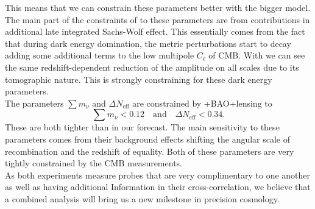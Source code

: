 \documentclass[../main.tex]{subfiles}
\begin{document}
    This means that we can constrain these parameters better with the bigger model. The main part of the constraints of \Planck to these parameters are from contributions in additional late integrated Sachs-Wolf effect. This essentially comes from the fact that during dark energy domination, the metric perturbations start to decay adding some additional terms to the low multipole $C_\ell$ of CMB. With \Euclid we can see the same redshift-dependent reduction of the amplitude on all scales due to its tomographic nature. This is strongly constraining for these dark energy parameters.\\
    The parameters $\sum m_\nu$ and $\Delta N_\mathrm{eff}$ are constrained by \Planck+BAO+lensing to 
    \begin{equation}
        \sum m_\nu < 0.12 \quad \text{and}\quad \Delta N_\mathrm{eff} < 0.34.
    \end{equation}
    These are both tighter than in our \Euclid forecast. The main sensitivity to these parameters comes from their background effects shifting the angular scale of recombination and the redshift of equality. Both of these parameters are very tightly constrained by the CMB measurements.\\
    As both experiments measure probes that are very complimentary to one another as well as having additional Information in their cross-correlation, we believe that a combined analysis will bring us a new milestone in precision cosmology.
    \begin{table}[!h]
        \renewcommand{\arraystretch}{1.2}
          \centering
        \caption{Forecast 68\% confidence levels for the different \Euclid probes and the combined probe. For the parameters $\sum m_\nu$ and $\Delta \neff$ we only state the 95\% upper limit as they are bound from below by their theoretical prior. The spectroscopic probe alone was not able to constrain $w_a$ within our prior edges.}

\label{tab:results}
\end{table}
\end{document}
